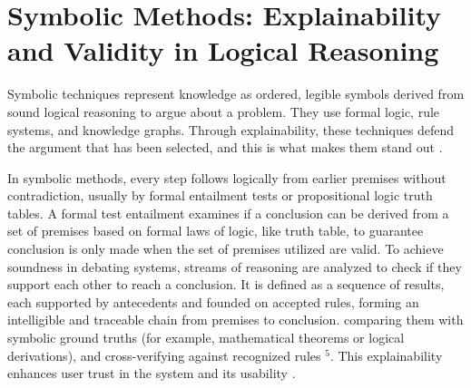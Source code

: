 \documentclass[conference]{IEEEtran}
\begin{document}
\section{Symbolic Methods: Explainability and Validity in Logical Reasoning}
Symbolic techniques represent knowledge as ordered, legible symbols derived from sound logical reasoning to argue about a problem.  They use formal logic, rule systems, and knowledge graphs. Through explainability, these techniques defend the argument that has been selected, and this is what makes them stand out \cite{kasif2024trilogy}. 

In symbolic methods, every step follows logically from earlier premises without contradiction, usually by formal entailment tests or propositional logic truth tables. A formal test entailment examines if a conclusion can be derived from a set
of premises based on formal laws of logic, like truth table, to guarantee conclusion is only made when the set of premises
utilized are valid. To achieve soundness in debating systems, streams of reasoning are analyzed to check if they support each other to reach a conclusion. It is defined as a sequence of results, each supported by antecedents and founded on accepted rules, forming an intelligible and traceable chain from premises to conclusion. comparing them with symbolic ground truths (for example, mathematical theorems or logical derivations), and cross-verifying against recognized rules \footnotetext[5]{\label{leereasoning}\leereasoning}$^5$. This explainability enhances user trust in the system and its usability \cite{kasif2024trilogy}.
\end{document}
